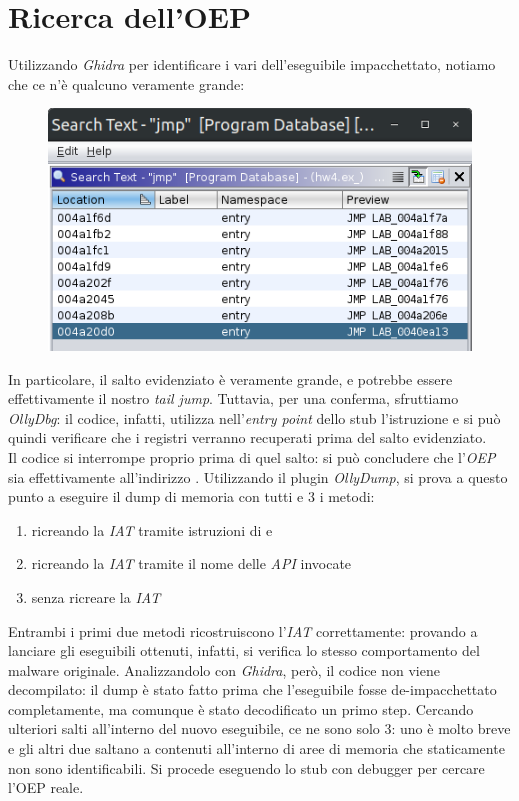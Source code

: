 \documentclass[a4paper, 12pt]{article}
\newcommand{\code}[1]{\colorbox{cverbbg}{\texttt{\StrSubstitute{#1}{_}{\_}}}}
\newcommand{\ghidra}{\emph{Ghidra}}
\newcommand{\ollydb}{\emph{OllyDbg}}
\newcommand{\api}{\emph{API}}
\newcommand{\key}[1]{\texttt{\StrSubstitute{#1}{_}{\_}}}
\begin{document}
\section{Ricerca dell'OEP}
Utilizzando \ghidra{} per identificare i vari \key{JMP} dell'eseguibile impacchettato, notiamo che ce n'è qualcuno veramente grande:
\begin{figure}[H]
\centering \includegraphics[scale=0.4]{jumps}
\end{figure}

In particolare, il salto evidenziato è veramente grande, e potrebbe essere effettivamente il nostro \textit{tail jump}. Tuttavia, per una conferma, sfruttiamo \ollydb{}: il codice, infatti, utilizza nell'\textit{entry point} dello stub l'istruzione \code{PUSHAD} e si può quindi verificare che i registri verranno recuperati prima del salto evidenziato. \\
Il codice si interrompe proprio prima di quel salto: si può concludere che l'\textit{OEP} sia effettivamente all'indirizzo \key{0x0040ea13}. Utilizzando il plugin \textit{OllyDump}, si prova a questo punto a eseguire il dump di memoria con tutti e 3 i metodi: 
\begin{enumerate}
\item ricreando la \textit{IAT} tramite istruzioni di \code{JMP} e \code{CALL}
\item ricreando la \textit{IAT} tramite il nome delle \api{} invocate
\item senza ricreare la \textit{IAT}
\end{enumerate}
Entrambi i primi due metodi ricostruiscono l'\textit{IAT} correttamente: provando a lanciare gli eseguibili ottenuti, infatti, si verifica lo stesso comportamento del malware originale. Analizzandolo con \ghidra{}, però, il codice non viene decompilato: il dump è stato fatto prima che l'eseguibile fosse de-impacchettato completamente, ma comunque è stato decodificato un primo step. Cercando ulteriori salti all'interno del nuovo eseguibile, ce ne sono solo 3: uno è molto breve e gli altri due saltano a contenuti all'interno di aree di memoria che staticamente non sono identificabili. Si procede eseguendo lo stub con debugger per cercare l'OEP reale.
\end{document}
